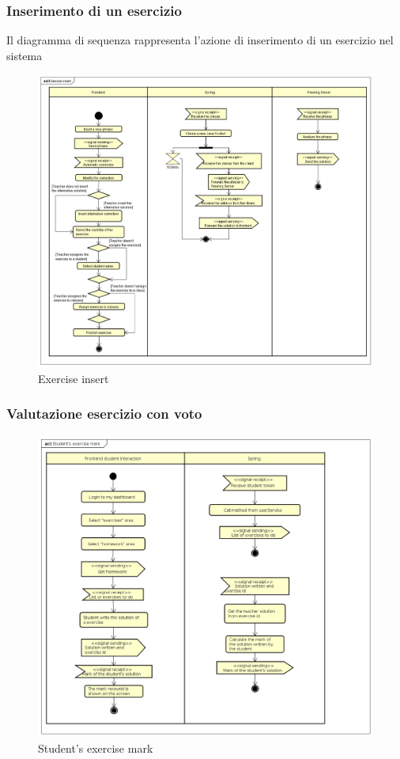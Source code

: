 \subsubsection{Inserimento di un esercizio}
Il diagramma di sequenza rappresenta l'azione di inserimento di un esercizio nel sistema
\begin{figure}[H]
\centering
\includegraphics[width=17cm, keepaspectratio]{img/Exercise-insert.png} 
\caption{Exercise insert}
\end{figure}

\subsubsection{Valutazione esercizio con voto}
\begin{figure}[H]
\centering
\includegraphics[width=17cm, keepaspectratio]{img/Student-exercise-mark.png} 
\caption{Student's exercise mark}
\end{figure}

